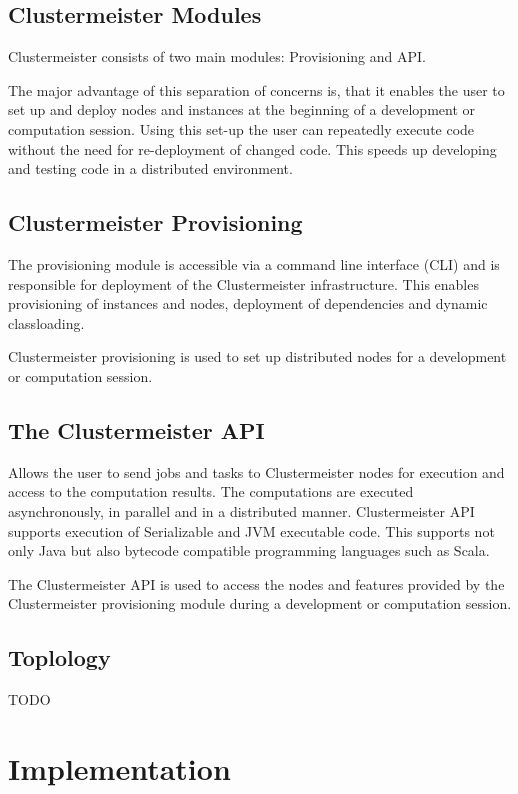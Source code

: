 \documentclass[english]{uzhpub}
\begin{document}
\subsection{Clustermeister Modules}

Clustermeister consists of two main modules: Provisioning and API.

The major advantage of this separation of concerns is, that it enables the user to set up and deploy nodes and instances at the beginning of a development or computation session. Using this set-up the user can repeatedly execute code without the need for re-deployment of changed code. This speeds up developing and testing code in a distributed environment.

\subsection{Clustermeister Provisioning}
The provisioning module is accessible via a command line interface (CLI) and is responsible for deployment of the Clustermeister infrastructure. This enables provisioning of instances and nodes, deployment of dependencies and dynamic classloading.

Clustermeister provisioning is used to set up distributed nodes for a development or computation session.

\subsection{The Clustermeister API}
Allows the user to send jobs and tasks to Clustermeister nodes for execution and access to the computation results. The computations are executed asynchronously, in parallel and in a distributed manner. Clustermeister API supports execution of Serializable and JVM executable code. This supports not only Java but also bytecode compatible programming languages such as Scala.

The Clustermeister API is used to access the nodes and features provided by the Clustermeister provisioning module during a development or computation session.

\subsection{Toplology}

TODO

\section{Implementation}
\end{document}
